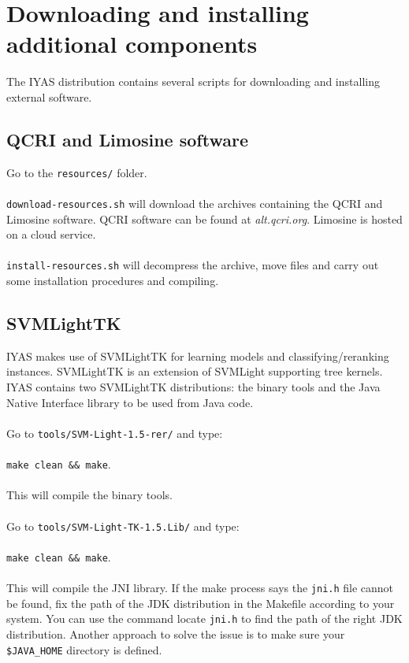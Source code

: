 \documentclass{wileysev}
\begin{document}
\section[Downloading and installing additional components]{Downloading and installing additional components}

The IYAS distribution contains several scripts for downloading and installing external software.

\subsection[QCRI and Limosine software]{QCRI and Limosine software}

Go to the \texttt{resources/} folder.
\\\\
\texttt{download-resources.sh} will download the archives containing the QCRI and Limosine software. QCRI software can be found at \textit{alt.qcri.org}. Limosine is hosted on a cloud service.
\\\\
\texttt{install-resources.sh} will decompress the archive, move files and carry out some installation procedures and compiling. 

\subsection[SVMLightTK]{SVMLightTK}

IYAS makes use of SVMLightTK for learning models and classifying/reranking instances. SVMLightTK is an extension of SVMLight supporting tree kernels. IYAS contains two SVMLightTK distributions: the binary tools and the Java Native Interface library to be used from Java code.
\\\\
Go to \texttt{tools/SVM-Light-1.5-rer/} and type:
\\\\
\texttt{make clean \&\& make}.
\\\\
This will compile the binary tools.
\\\\
Go to \texttt{tools/SVM-Light-TK-1.5.Lib/} and type:
\\\\
\texttt{make clean \&\& make}.
\\\\
This will compile the JNI library. If the make process says the \texttt{jni.h} file cannot be found, fix the path of the JDK distribution in the Makefile according to your system. You can use the command locate \texttt{jni.h} to find the path of the right JDK distribution. Another approach to solve the issue is to make sure your \texttt{\$JAVA\_HOME} directory is defined.
\end{document}
